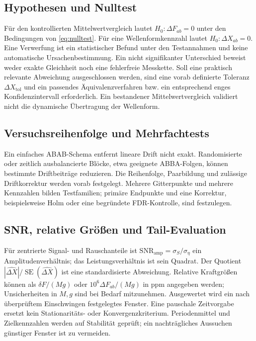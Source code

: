 \documentclass[11pt,a4paper]{article}
\newcommand{\SE}{\operatorname{SE}}
\begin{document}
\subsection{Hypothesen und Nulltest}
Für den kontrollierten Mittelwertvergleich lautet $H_0:\Delta F_{ab}=0$ unter den Bedingungen von \eqref{eq:nulltest}. Für eine Wellenformkennzahl lautet $H_0:\Delta X_{ab}=0$. Eine Verwerfung ist ein statistischer Befund unter den Testannahmen und keine automatische Ursachenbestimmung.
Ein nicht signifikanter Unterschied beweist weder exakte Gleichheit noch eine fehlerfreie Messkette. Soll eine praktisch relevante Abweichung ausgeschlossen werden, sind eine vorab definierte Toleranz $\Delta X_{\mathrm{tol}}$ und ein passendes Äquivalenzverfahren bzw. ein entsprechend enges Konfidenzintervall erforderlich. Ein bestandener Mittelwertvergleich validiert nicht die dynamische Übertragung der Wellenform.

\subsection{Versuchsreihenfolge und Mehrfachtests}
Ein einfaches ABAB-Schema entfernt lineare Drift nicht exakt. Randomisierte oder zeitlich ausbalancierte Blöcke, etwa geeignete ABBA-Folgen, können bestimmte Driftbeiträge reduzieren. Die Reihenfolge, Paarbildung und zulässige Driftkorrektur werden vorab festgelegt. Mehrere Gitterpunkte und mehrere Kennzahlen bilden Testfamilien; primäre Endpunkte und eine Korrektur, beispielsweise Holm oder eine begründete FDR-Kontrolle, sind festzulegen.

\subsection{SNR, relative Größen und Tail-Evaluation}
Für zentrierte Signal- und Rauschanteile ist $\mathrm{SNR}_{\mathrm{amp}}=\sigma_S/\sigma_\eta$ ein Amplitudenverhältnis; das Leistungsverhältnis ist sein Quadrat. Der Quotient $|\widehat{\Delta X}|/\SE(\widehat{\Delta X})$ ist eine standardisierte Abweichung.
Relative Kraftgrößen können als $\delta F/(Mg)$ oder $10^6\Delta F_{ab}/(Mg)$ in ppm angegeben werden; Unsicherheiten in $M,g$ sind bei Bedarf mitzunehmen.
Ausgewertet wird ein nach überprüftem Einschwingen festgelegtes Fenster. Eine pauschale Zeitvorgabe ersetzt kein Stationaritäts- oder Konvergenzkriterium. Periodenmittel und Zielkennzahlen werden auf Stabilität geprüft; ein nachträgliches Aussuchen günstiger Fenster ist zu vermeiden.
\end{document}
